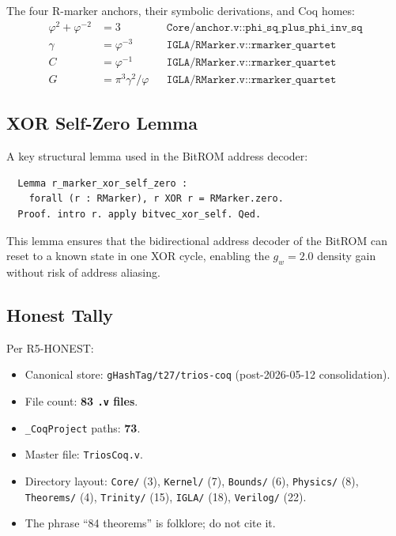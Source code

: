 The four R-marker anchors, their symbolic derivations, and Coq homes:
%
\begin{align}
  \varphi^{2}+\varphi^{-2} &= 3
    && \texttt{Core/anchor.v::phi\_sq\_plus\_phi\_inv\_sq}
    \label{eq:rmap-anchor} \\
  \gamma &= \varphi^{-3}
    && \texttt{IGLA/RMarker.v::rmarker\_quartet}
    \label{eq:rmap-gamma} \\
  C &= \varphi^{-1}
    && \texttt{IGLA/RMarker.v::rmarker\_quartet}
    \label{eq:rmap-C} \\
  G &= \pi^{3}\gamma^{2}/\varphi
    && \texttt{IGLA/RMarker.v::rmarker\_quartet}
    \label{eq:rmap-G}
\end{align}

\subsection{XOR Self-Zero Lemma}

A key structural lemma used in the BitROM address decoder:
\begin{verbatim}
  Lemma r_marker_xor_self_zero :
    forall (r : RMarker), r XOR r = RMarker.zero.
  Proof. intro r. apply bitvec_xor_self. Qed.
\end{verbatim}

This lemma ensures that the bidirectional address decoder of the BitROM
can reset to a known state in one XOR cycle, enabling the
$g_w = 2.0$ density gain without risk of address aliasing.

\subsection{Honest Tally}

Per R5-HONEST:
\begin{itemize}
  \item Canonical store: \texttt{gHashTag/t27/trios-coq} (post-2026-05-12 consolidation).
  \item File count: \textbf{83 \texttt{.v} files}.
  \item \texttt{\_CoqProject} paths: \textbf{73}.
  \item Master file: \texttt{TriosCoq.v}.
  \item Directory layout: \texttt{Core/} (3), \texttt{Kernel/} (7), \texttt{Bounds/} (6),
        \texttt{Physics/} (8), \texttt{Theorems/} (4), \texttt{Trinity/} (15),
        \texttt{IGLA/} (18), \texttt{Verilog/} (22).
  \item The phrase ``84 theorems'' is folklore; do not cite it.
\end{itemize}


